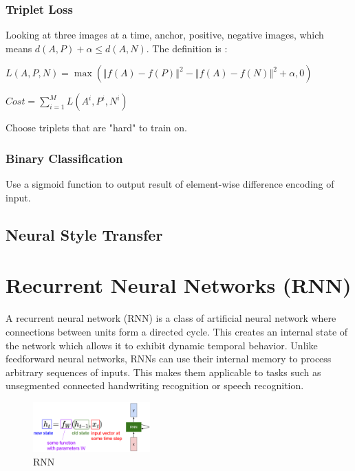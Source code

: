 \documentclass{article}
\begin{document}
	\subsubsection{Triplet Loss}
	\begin{flushleft}
		Looking at three images at a time, anchor, positive, negative images, which means $d(A,P) + \alpha \leq d(A,N)$. The definition is :
	\end{flushleft}
	\begin{center}
		$L(A,P,N) = \max(\left\Vert f(A) - f(P) \right\Vert^2 - \left\Vert f(A) - f(N) \right\Vert^2 + \alpha, 0)$
	\end{center}
	\begin{center}
		$Cost = \sum_{i=1}^M L(A^i, P^i, N^i)$
	\end{center}
	\begin{flushleft}
		Choose triplets that are "hard" to train on. 
	\end{flushleft}
	\subsubsection{Binary Classification}
	\begin{flushleft}
		Use a sigmoid function to output result of element-wise difference encoding of input.
	\end{flushleft}
	\subsection{Neural Style Transfer}
	
	\section{Recurrent Neural Networks (RNN)}
	
	A recurrent neural network (RNN) is a class of artificial neural network where connections between units form a directed cycle. This creates an internal state of the network which allows it to exhibit dynamic temporal behavior. Unlike feedforward neural networks, RNNs can use their internal memory to process arbitrary sequences of inputs. This makes them applicable to tasks such as unsegmented connected handwriting recognition or speech recognition.
	
	\begin{figure}[h]
		\centering
		\includegraphics[width=0.4\textwidth]{Images/recurrent_neural_networks/1.png}
		\caption{RNN}
	\end{figure}
	
\end{document}
